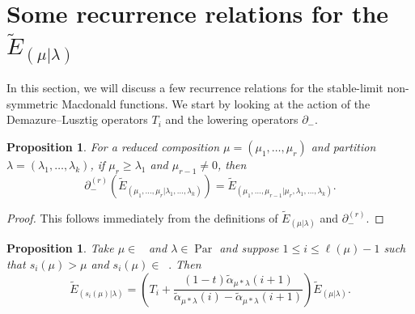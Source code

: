 \documentclass[11pt]{article}
\newtheorem{prop}[theo]{Proposition}
\theoremstyle{definition}
\numberwithin{equation}{section}
\DeclareMathOperator{\Par}{\mathrm{Par}}
\DeclareMathOperator{\Compred}{\mathrm{Comp}^{\textit{red}}}
\begin{document}
\section{Some recurrence relations for the \texorpdfstring{$\widetilde{E}_{(\mu|\lambda)}$}{E\_(mu | lambda)}}\label{recurrence relations section}

In this section, we will discuss a few recurrence relations for the stable-limit non-symmetric Macdonald functions. We start by looking at the action of the Demazure--Lusztig operators $T_i$ and the lowering operators $\partial_{-}$.

\begin{prop}
    For a reduced composition $\mu = (\mu_1,\ldots,\mu_r)$ and partition $\lambda =(\lambda_1,\ldots,\lambda_k)$, if $\mu_r \geq \lambda_1$ and $\mu_{r-1} \neq 0$, then 
    \begin{equation}
        \partial_{-}^{(r)} \left( \widetilde{E}_{(\mu_1,\ldots,\mu_r|\lambda_1,\ldots,\lambda_k)} \right) = \widetilde{E}_{(\mu_1,\ldots,\mu_{r-1}|\mu_r,\lambda_1,\ldots,\lambda_k)}.
    \end{equation}
\end{prop}
\begin{proof}
    This follows immediately from the definitions of $\widetilde{E}_{(\mu|\lambda)}$ and $\partial_{-}^{(r)}.$
\end{proof}

\begin{prop}
Take $\mu \in \Compred$ and $\lambda \in \Par$ and suppose $1\leq i \leq \ell(\mu) -1$ such that $s_i(\mu) > \mu$ and $s_i(\mu) \in \Compred.$  Then 
\begin{equation}
    \widetilde{E}_{(s_i(\mu)|\lambda)} = 
  \left( T_i + \frac{(1-t)\widetilde{\alpha}_{\mu*\lambda}(i+1)}{\widetilde{\alpha}_{\mu*\lambda}(i)- \widetilde{\alpha}_{\mu*\lambda}(i+1)} \right)  \widetilde{E}_{(\mu|\lambda)}.
\end{equation}
\end{prop}
\end{document}
